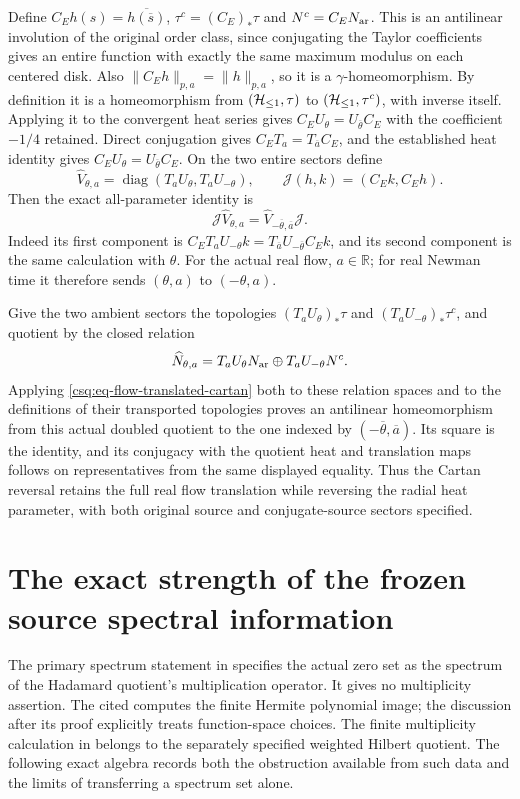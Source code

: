 Define $C_Eh(s)=\overline{h(\overline s)}$,
$\tau^c=(C_E)_*\tau$ and $N^c=C_EN_{\rm ar}$.
This is an antilinear involution of the original order class,
since conjugating the Taylor coefficients gives an entire function
with exactly the same maximum modulus on each centered disk.
Also $\|C_Eh\|_{p,a}=\|h\|_{p,a}$, so it is a $\gamma$-homeomorphism.
By definition it is a homeomorphism from $(\mathcal H_{\leq 1},\tau)$ to
$(\mathcal H_{\leq 1},\tau^c)$, with inverse itself. Applying it to the convergent
heat series gives $C_EU_\theta=U_{\overline\theta}C_E$ with the
coefficient $-1/4$ retained. Direct conjugation gives
$C_ET_a=T_{\overline a}C_E$, and the established heat identity gives
$C_EU_\theta=U_{\overline\theta}C_E$.
On the two entire sectors define
\[
 \widehat V_{\theta,a}
   =\operatorname{diag}(T_aU_\theta,T_aU_{-\theta}),\qquad
 \mathcal J(h,k)=(C_Ek,C_Eh).
\]
Then the exact all-parameter identity is
\begin{equation}
 \mathcal J\widehat V_{\theta,a}
 =\widehat V_{-\overline\theta,\overline a}\mathcal J .
 \label{csq:eq-flow-translated-cartan}
\end{equation}
Indeed its first component is
$C_ET_aU_{-\theta}k=T_{\overline a}U_{-\overline\theta}C_Ek$,
and its second component is the same calculation with $\theta$.
For the actual real flow, $a\in\mathbb R$; for real Newman time it
therefore sends $(\theta,a)$ to $(-\theta,a)$.

Give the two ambient sectors the topologies
$(T_aU_\theta)_*\tau$ and $(T_aU_{-\theta})_*\tau^c$, and quotient
by the closed relation
\[
 \widehat N_{\theta,a}
   =T_aU_\theta N_{\rm ar}\oplus T_aU_{-\theta}N^c .
\]
Applying \eqref{csq:eq-flow-translated-cartan} both to these relation
spaces and to the definitions of their transported topologies proves
an antilinear homeomorphism from this actual doubled quotient to
the one indexed by $(-\overline\theta,\overline a)$.
Its square is the identity, and its conjugacy with the quotient heat
and translation maps follows on representatives from the same
displayed equality. Thus the Cartan reversal retains the full real
flow translation while reversing the radial heat parameter, with
both original source and conjugate-source sectors specified.

\section{The exact strength of the frozen source spectral information}
\label{csq:sec-source-spectral-strength}

The primary spectrum statement in \cite[Proposition~3.6(ii)]{ccmProlate2024}
specifies the actual zero set as the spectrum of the Hadamard
quotient's multiplication operator. It gives no multiplicity
assertion. The cited \cite[Proposition~2.24]{connesMarcolli2008} computes the
finite Hermite polynomial image; the discussion after its proof
explicitly treats function-space choices. The finite multiplicity
calculation in \cite[Theorem~2.47 and equations (2.447)--(2.449)]{connesMarcolli2008}
belongs to the separately specified weighted Hilbert quotient.
The following exact algebra records both the obstruction available
from such data and the limits of transferring a spectrum set alone.


